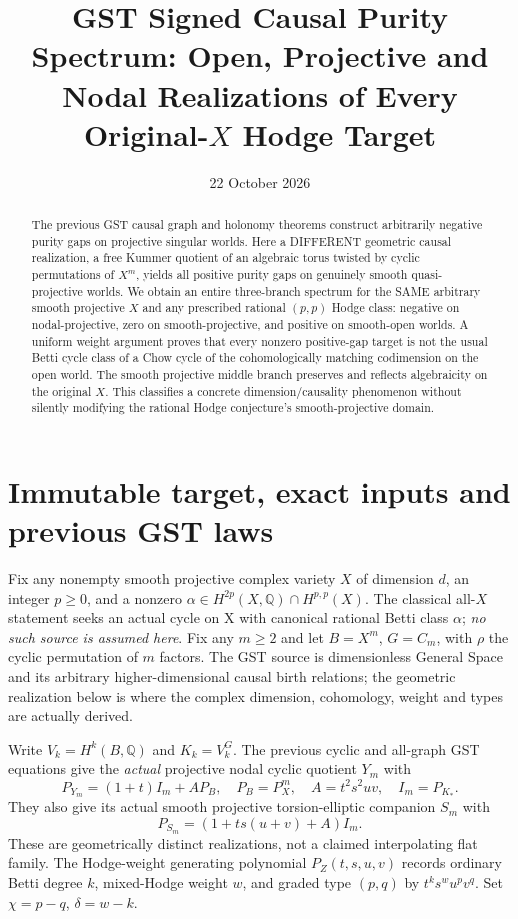 \documentclass[11pt]{article}
\title{GST Signed Causal Purity Spectrum: Open, Projective and Nodal
Realizations of Every Original-$X$ Hodge Target}
\date{22 October 2026}
\begin{document}
\maketitle
\begin{abstract}
The previous GST causal graph and holonomy theorems construct arbitrarily
negative purity gaps on projective singular worlds. Here a DIFFERENT
geometric causal realization, a free Kummer quotient of an algebraic
torus twisted by cyclic permutations of $X^m$, yields all positive
purity gaps on genuinely smooth quasi-projective worlds. We obtain
an entire three-branch spectrum for the SAME arbitrary smooth
projective $X$ and any prescribed rational $(p,p)$ Hodge class:
negative on nodal-projective, zero on smooth-projective, and positive
on smooth-open worlds. A uniform weight argument proves that every
nonzero positive-gap target is not the usual Betti cycle class of a
Chow cycle of the cohomologically matching codimension on the open
world. The smooth projective middle branch preserves and reflects
algebraicity on the original $X$. This classifies a concrete
dimension/causality phenomenon without silently modifying the
rational Hodge conjecture's smooth-projective domain.
\end{abstract}

\section{Immutable target, exact inputs and previous GST laws}
Fix any nonempty smooth projective complex variety $X$
of dimension $d$, an integer $p\geq0$, and a nonzero
$\alpha\in H^{2p}(X,\mathbb Q)\cap H^{p,p}(X)$.
The classical all-$X$ statement seeks an actual cycle on X with
canonical rational Betti class $\alpha$; \emph{no such source is
assumed here}. Fix any $m\geq2$ and let
$B=X^m$, $G=C_m$, with $\rho$ the cyclic permutation of $m$
factors.  The GST source is dimensionless General Space and its
arbitrary higher-dimensional causal birth relations; the geometric
realization below is where the complex dimension, cohomology, weight
and types are actually derived.

Write $V_k=H^k(B,\mathbb Q)$ and
$K_k=V_k^G$. The previous cyclic and all-graph GST equations
give the \emph{actual} projective nodal cyclic quotient $Y_m$
with
\[
 P_{Y_m}=(1+t)I_m+A P_B,\quad
 P_B=P_X^m,\quad A=t^2s^2uv,\quad
 I_m=P_{K_*}.
 \tag{1}
\]
They also give its actual smooth projective torsion-elliptic
companion $S_m$ with
\[
 P_{S_m}=(1+ts(u+v)+A)I_m.
 \tag{2}
\]
These are geometrically distinct realizations, not a claimed
interpolating flat family. The Hodge-weight generating polynomial
$P_Z(t,s,u,v)$ records ordinary Betti degree $k$, mixed-Hodge
weight $w$, and graded type $(p,q)$ by $t^ks^wu^pv^q$.
Set $\chi=p-q$, $\delta=w-k$.
\end{document}
